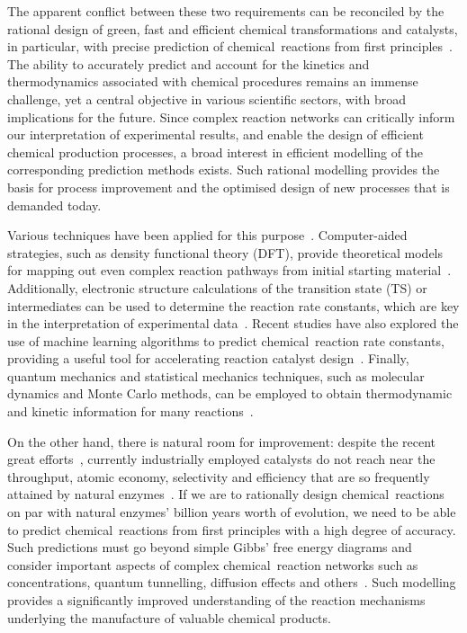 The apparent conflict between these two requirements can be reconciled by
the rational design of green,
fast and efficient chemical transformations and catalysts,
in particular,
with precise prediction of chemical~reactions from first principles~\cite{Kitchin_2012}.
The ability to accurately predict and account for the kinetics and thermodynamics associated
with chemical procedures remains an immense challenge,
yet a central objective in various scientific sectors,
with broad implications for the future.
Since complex reaction networks can critically inform our interpretation of experimental results,
and enable the design of efficient chemical production processes,
a broad interest in efficient modelling of the corresponding prediction methods exists.
Such rational modelling provides the basis for process improvement and the optimised design of new processes
that is demanded today.

Various techniques have been applied for this purpose~\cite{Houk_2014,Chew_2020,Chin_2022,Cao2022}.
Computer-aided strategies,
such as density functional theory (DFT),
provide theoretical models for mapping out even complex reaction pathways from initial starting material~\cite{Maeda_2011,Simm_2017,Rappoport_2019}.
Additionally,
electronic structure calculations of the transition state (TS) or intermediates can be used to determine the reaction rate constants,
which are key in the interpretation of experimental data~\cite{Plata_2015,Santoro_2016,Coelho_2019,Oliveira_2020}.
Recent studies have also explored the use of machine learning algorithms
to predict chemical~reaction rate constants,
providing a useful tool for
accelerating reaction catalyst design~\cite{Komp_2022,Tu_2022}.
Finally,
quantum mechanics and statistical mechanics techniques,
such as molecular dynamics and Monte Carlo methods,
can be employed to obtain thermodynamic and kinetic information for many reactions~\cite{Wang_2014}.

On the other hand,
there is natural room for improvement:
despite the recent great efforts~\cite{Peng_2016},
currently industrially employed catalysts do
not reach near the throughput,
atomic economy,
selectivity and efficiency that
are so frequently attained by natural
enzymes~\cite{Catalysis_in_Chemistry_and_Enzymology}.
If we are to rationally design chemical~reactions on par with natural enzymes' billion years worth of evolution,
we need to be able to predict chemical~reactions from first principles with a
high degree of accuracy.
Such predictions must go beyond simple Gibbs' free energy
diagrams and consider important aspects of complex chemical~reaction networks
such as concentrations,
quantum tunnelling,
diffusion effects and others~\cite{Besora_2018}.
Such modelling provides a significantly improved understanding of the reaction mechanisms underlying the manufacture of valuable chemical products.

